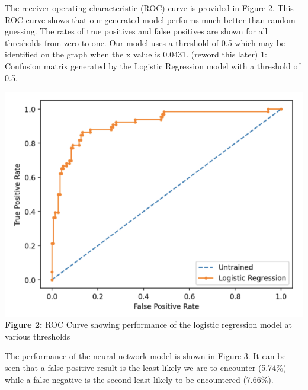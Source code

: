 \documentclass{article}
\begin{document}
\quad The receiver operating characteristic (ROC) curve is provided in Figure 2. This ROC curve shows that our generated model performs much better than random guessing. The rates of true positives and false positives are shown for all thresholds from zero to one. Our model uses a threshold of 0.5 which may be identified on the graph when the x value is 0.0431. (reword this later)
 1: Confusion matrix generated by the Logistic Regression model with a threshold of 0.5.
 \begin{center}
 \includegraphics[scale=.65]{figure2.png}\\
 \textbf{Figure 2:} ROC Curve showing performance of the logistic regression model at various thresholds
\end{center}

\par The performance of the neural network model is shown in Figure 3. It can be seen that a false positive result is the least likely we are to encounter (5.74\%) while a false negative is the second least likely to be encountered (7.66\%).
\end{document}
